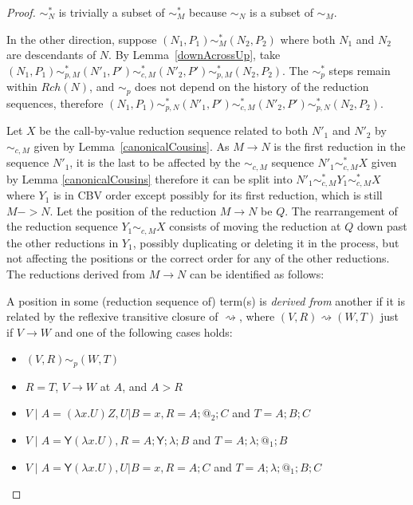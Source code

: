 \documentclass{article}
\newcommand{\tY}{\mathsf{Y}}
\theoremstyle{definition}
\newtheorem{definition}{Definition}
\theoremstyle{lemma}
\theoremstyle{remark}
\begin{document}
\begin{proof}
$\sim_N^*$ is trivially a subset of $\sim_M^*$ because $\sim_N$ is a subset of $\sim_M$.

In the other direction, suppose $(N_1, P_1) \sim_M^* (N_2, P_2)$ where both $N_1$ and $N_2$ are descendants of $N$. By Lemma~\ref{downAcrossUp}, take $(N_1, P_1) \sim_{p,M}^* (N'_1, P') \sim_{c,M}^* (N'_2, P') \sim_{p,M}^* (N_2, P_2)$. 
The $\sim_p^*$ steps remain within $Rch(N)$, and $\sim_p$ does not depend on the history of the reduction sequences, therefore $(N_1, P_1) \sim_{p,N}^* (N'_1, P') \sim_{c,M}^* (N'_2, P') \sim_{p,N}^* (N_2, P_2)$.

Let $X$ be the call-by-value reduction sequence related to both $N'_1$ and $N'_2$ by $\sim_{c,M}$ given by Lemma~\ref{canonicalCousins}. 
As $M \to N$ is the first reduction in the sequence $N'_1$, it is the last to be affected by the $\sim_{c,M}$ sequence $N'_1 \sim_{c,M}^* X$ given by Lemma \ref{canonicalCousins} therefore it can be split into $N'_1 \sim_{c,M}^* Y_1 \sim_{c,M}^* X$ where $Y_1$ is in CBV order except possibly for its first reduction, which is still $M -> N$. Let the position of the reduction $M \to N$ be $Q$. 
The rearrangement of the reduction sequence $Y_1 \sim_{c,M} X$ consists of moving the reduction at $Q$ down past the other reductions in $Y_1$, possibly duplicating or deleting it in the process, but not affecting the positions or the correct order for any of the other reductions. 
The reductions derived from $M \to N$ can be identified as follows:

A position in some (reduction sequence of) term(s) is \emph{derived from} another if it is related by the reflexive transitive closure of $\rightsquigarrow$, where $(V,R) \rightsquigarrow (W,T)$ just if $V \to W$ and one of the following cases holds:
\begin{itemize}
    \item $(V,R) \sim_p (W,T)$
    \item $R = T$, $V \to W$ at $A$, and $A > R$
    \item $V \mid A = (\lambda x.U) Z, U | B = x, R = A;@_2;C$ and $T = A;B;C$
    \item $V \mid A = \tY (\lambda x.U), R = A;\tY;\lambda;B$ and $T = A;\lambda;@_1;B$
    \item $V \mid A = \tY (\lambda x.U), U | B = x, R = A;C$ and $T = A;\lambda;@_1;B;C$
\end{itemize}


\end{proof}
\end{document}

